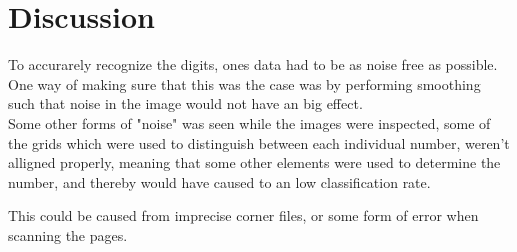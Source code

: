 \chapter{Discussion}
To accurarely recognize the digits, ones data had to be as noise free as possible. One way of making sure that this was the case was by performing smoothing such that noise in the image would not have an big effect.\\


Some other forms of "noise" was seen while the images were inspected, some of the grids which were used to distinguish between each individual number, weren't alligned properly, meaning that some other elements were used to determine the number, and thereby would have caused to an low classification rate. 


This could be caused from imprecise corner files, or some form of error when scanning the pages. \\



